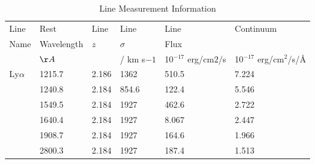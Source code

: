 \documentclass[a4paper,fleqn,usenatbib]{mnras}
\begin{document}

\begin{table}
  \centering
  \begin{tabular}{l  l  l    lll}
    \hline \hline 
    Line 	    &   Rest	      & Line       & Line	       &	Line			                 &   Continuum \\ 
    Name	    &   Wavelength  &  $z$       & $\sigma$ 	&	Flux			                 & \\
                    &    $\AA $        &              & /  km s$-1$	&     10$^{-17}$ erg/cm$2$/s &  10$^{-17}$ erg/cm$^2$/s/\AA  \\
Ly$\alpha$  &	 1215.7	&	2.186      &	1362	&	510.5		                &	7.224 \\
\nv		    &   1240.8	&	2.184     &	 854.6	&	122.4	                    	&	5.546 \\ 
\civ		    &  1549.5	&	2.184    &	1927	&	462.6		                &	2.722 \\ 
\heii	    &	 1640.4	&	2.184    &	1927	&    	  8.067	                   	&	2.447 \\  
\ciii 	    &	 1908.7	&	2.184    &	1927	&	164.6	                   	&	1.966  \\ 
\mgii	    &	 2800.3	&	2.184   & 	1927	&	187.4	                   	&	1.513  \\
   \hline \hline   
  \end{tabular}
  \caption{Line Measurement Information}
 \label{tab:line_values}
\end{table}
\end{document}

